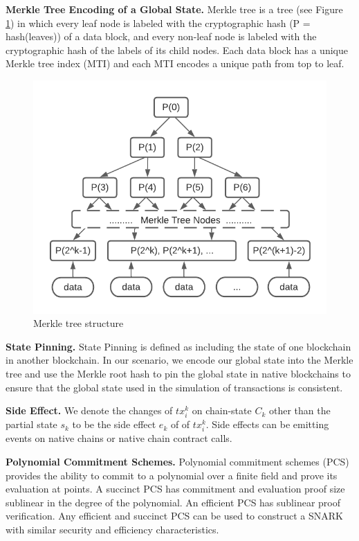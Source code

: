 \documentclass[pageno]{jpaper}
\begin{document}
\smallskip\noindent\textbf{Merkle Tree Encoding of a Global State.}
Merkle tree \cite{becker2008merkle} is a tree (see Figure \ref{merkle-tree}) in which every leaf node is labeled with the cryptographic hash (P = hash(leaves)) of a data block, and every non-leaf node is labeled with the cryptographic hash of the labels of its child nodes. Each data block has a unique Merkle tree index (MTI) and each MTI encodes a unique path from top to leaf.\\

\begin{figure}[!ht]
\centerline{
\includegraphics[scale=0.6]{merkle-tree}}
\caption{Merkle tree structure}\label{merkle-tree}
\end{figure}

\smallskip\noindent\textbf{State Pinning.}
State Pinning \cite {robinson2019anonymous} is defined as including the state of one blockchain in another blockchain. In our scenario, we encode our global state into the Merkle tree and use the Merkle root hash to pin the global state in native blockchains to ensure that the global state used in the simulation of transactions is consistent.

\smallskip\noindent\textbf{Side Effect.}
We denote the changes of $tx_i^k$ on chain-state $C_k$ other than the partial state $s_k$ to be the side effect $e_k$ of of $tx_i^k$. Side effects can be emitting events on native chains or native chain contract calls.

\smallskip\noindent\textbf{Polynomial Commitment Schemes.}
Polynomial commitment schemes (PCS) \cite{boneh2020halo-pcs,boneh2020efficient-pcs,kate2010polynomial-pcs} provides the ability to commit to a polynomial over a finite field and prove its evaluation at points. A succinct PCS has commitment and evaluation proof size sublinear in the degree of the polynomial. An efficient PCS has sublinear proof verification. Any efficient and succinct PCS can be used to construct a SNARK \cite{mayer2016zk} with similar security and efficiency characteristics.
\end{document}
